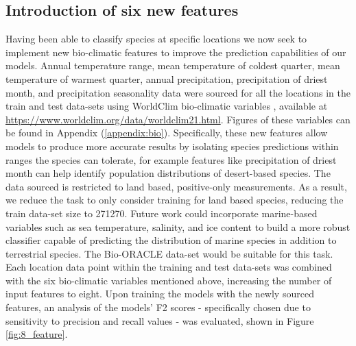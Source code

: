 \subsection{Introduction of six new features}

Having been able to classify species at specific locations we now seek to implement new bio-climatic features to improve the prediction capabilities of our models. Annual temperature range, mean temperature of coldest quarter, mean temperature of warmest quarter, annual precipitation, precipitation of driest month, and precipitation seasonality data were sourced for all the locations in the train and test data-sets using WorldClim bio-climatic variables \cite{worldclim}, available at \url{https://www.worldclim.org/data/worldclim21.html}. Figures of these variables can be found in Appendix (\ref{appendix:bio}). Specifically, these new features allow models to produce more accurate results by isolating species predictions within ranges the species can tolerate, for example features like precipitation of driest month can help identify population distributions of desert-based species. The data sourced is restricted to land based, positive-only measurements. As a result, we reduce the task to only consider training for land based species, reducing the train data-set size to 271270. Future work could incorporate marine-based variables such as sea temperature, salinity, and ice content to build a more robust classifier capable of predicting the distribution of marine species in addition to terrestrial species. The Bio-ORACLE data-set \cite{oracle1} \cite{oracle2} would be suitable for this task. Each location data point within the training and test data-sets was combined with the six bio-climatic variables mentioned above, increasing the number of input features to eight. Upon training the models with the newly sourced features, an analysis of the models' F2 scores - specifically chosen due to sensitivity to precision and recall values - was evaluated, shown in Figure \ref{fig:8_feature}.


